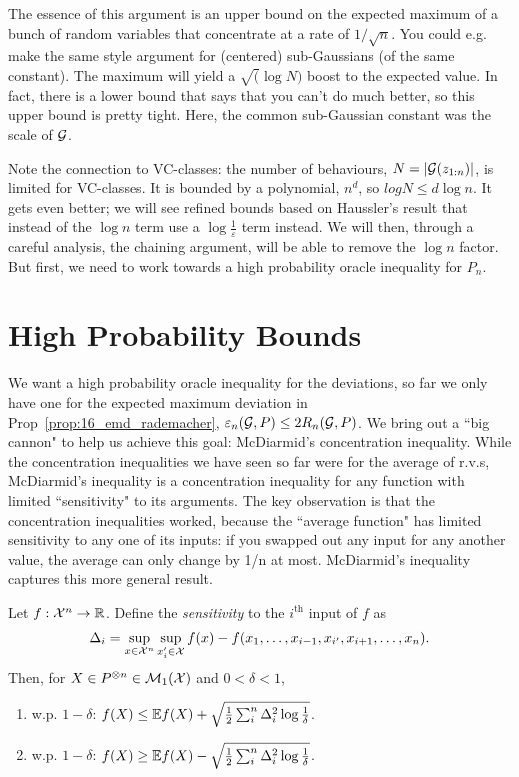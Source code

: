 \documentclass[twoside]{article}
\newcommand{\zn}{z_{1:n}}
\begin{document}
The essence of this argument is an upper bound on the expected maximum of a bunch of random variables that concentrate at a rate of $1/\sqrt{n}$. You could e.g. make the same style argument for (centered) sub-Gaussians (of the same constant). The maximum will yield a $\sqrt( \log N )$ boost to the expected value. In fact, there is a lower bound that says that you can't do much better, so this upper bound is pretty tight. Here, the common sub-Gaussian constant was the scale of $\mathcal{G}$.

Note the connection to VC-classes: the number of behaviours, $N = | \cG(\zn) |$, is limited for VC-classes. It is bounded by a polynomial, $n^d$, so $log N \leq d \log n $. It gets even better; we will see refined bounds based on Haussler's result that instead of the $\log n$ term use a $\log \frac1\varepsilon$ term instead. We will then, through a careful analysis, the chaining argument, will be able to remove the $\log n$ factor. But first, we need to work towards a high probability oracle inequality for $P_n$.

\section{High Probability Bounds}

We want a high probability oracle inequality for the deviations, so far we only have one for the expected maximum deviation in Prop~\ref{prop:16_emd_rademacher}, $\varepsilon_n(\mathcal{G}, P) \leq 2  R_n(\mathcal{G}, P)$. We bring out a ``big cannon" to help us achieve this goal: McDiarmid's concentration inequality. While the concentration inequalities we have seen so far were for the average of r.v.s, McDiarmid's inequality is a concentration inequality for any function with limited ``sensitivity" to its arguments. The key observation is that the concentration inequalities worked, because the ``average function" has limited sensitivity to any one of its inputs: if you swapped out any input for any another value, the average can only change by 1/n at most. McDiarmid's inequality captures this more general result.

\begin{theorem}[McDiarmid]
    Let $f: \mathcal{X}^n \to \mathbb{R}$. Define the \textit{sensitivity} to the $i^\mathrm{th}$ input of $f$ as
    \begin{equation*}
        \Delta_i = \sup_{x \in \mathcal{X}^n} \sup_{x_i' \in \mathcal{X}} f(x) - f(x_1, \dotsc, x_{i-1}, x_{i'}, x_{i+1}, \dotsc, x_n).
    \end{equation*}
    Then, for $X \in P^{\otimes n} \in \mathcal{M}_1(\mathcal{X})$ and $0 < \delta < 1$,
    \begin{enumerate}[label=(\alph*)]
        \item w.p. $1-\delta$: $f(X) \leq \mathbb{E} f(X) + \sqrt{\frac12 \sum_i^n \Delta_i^2 \log \frac1\delta }$.
        \item  w.p. $1-\delta$: $f(X) \geq \mathbb{E} f(X) - \sqrt{\frac12 \sum_i^n \Delta_i^2 \log \frac1\delta }$.
        \end{enumerate}
\end{theorem}
\end{document}
